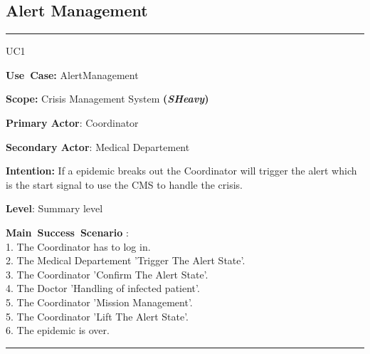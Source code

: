 \subsection{Alert Management}
\vspace{0.5cm}
\hrule
\vspace{0.5cm}
\begin{lyxlist}{UC1}
\small{
\item [\textbf{Use~Case:}] AlertManagement
\item [\textbf{Scope:}] Crisis Management System \textbf{(\emph{SHeavy})}
\item [\textbf{Primary Actor}:] Coordinator
\item [\textbf{Secondary Actor}:] Medical Departement
\item [\textbf{Intention:}] If a epidemic breaks out the Coordinator will
trigger the alert which is the start signal to use the CMS to handle the crisis.
\item [\textbf{Level}:]Summary level
\item [\textbf{Main~Success~Scenario}]:\\
1. The Coordinator has to log in.\\
2. The Medical Departement 'Trigger The Alert State'.\\
3. The Coordinator 'Confirm The Alert State'.\\
4. The Doctor 'Handling of infected patient'.\\
5. The Coordinator 'Mission Management'.\\
5. The Coordinator 'Lift The Alert State'.\\
6. The epidemic is over.\\
}
\end{lyxlist}
\hrule  
\vspace{0.5cm} 

